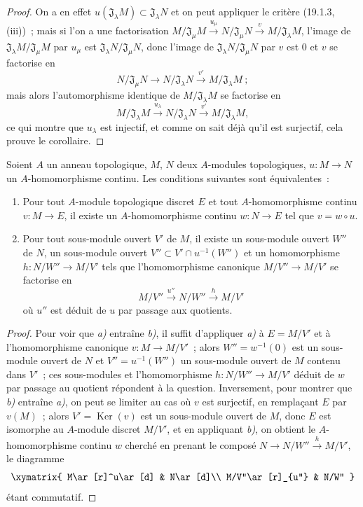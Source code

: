 \begin{proof}
On a en effet $u(\mathfrak J_\lambda M)\subset\mathfrak J_\lambda N$ et on
peut appliquer le critère (19.1.3, (iii))~; mais si l'on a une factorisation
$M/\mathfrak J_\mu M\xrightarrow{u_\mu}N/\mathfrak J_\mu N\xrightarrow{v}M/\mathfrak J_\lambda M$,
l'image de $\mathfrak J_\lambda M/\mathfrak J_\mu M$ par $u_\mu$ est
$\mathfrak J_\lambda N/\mathfrak J_\mu N$, donc l'image de
$\mathfrak J_\lambda N/\mathfrak J_\mu N$ par $v$ est 0 et $v$ se factorise en
\[
  N/\mathfrak J_\mu N\longrightarrow N/\mathfrak J_\lambda N
  \xrightarrow{v'}M/\mathfrak J_\lambda M~;
\]
mais alors l'automorphisme identique de $M/\mathfrak J_\lambda M$ se factorise
en
\[
  M/\mathfrak J_\lambda M\xrightarrow{u_\lambda}
  N/\mathfrak J_\lambda N\xrightarrow{v'}M/\mathfrak J_\lambda M,
\]
ce qui montre que $u_\lambda$ est injectif, et comme on sait déjà qu'il est
surjectif, cela prouve le corollaire.
\end{proof}

\begin{proposition}[19.1.5]
\label{0.19.1.5-fr}
Soient $A$ un anneau topologique, $M$, $N$ deux $A$-modules topologiques,
$u:M\to N$ un $A$-homomorphisme continu. Les conditions suivantes sont
équivalentes~:
\begin{enumerate}
  \item[\textup{a)}] Pour tout $A$-module topologique \textup{discret} $E$ et tout
  $A$-homomorphisme continu $v:M\to E$, il existe un $A$-homomorphisme continu
  $w:N\to E$ tel que $v=w\circ u$.
  \item[\textup{b)}] Pour tout sous-module ouvert $V'$ de $M$, il existe un sous-module
  ouvert $W''$ de $N$, un sous-module ouvert
  $V''\subset V'\cap u^{-1}(W'')$ et un homomorphisme
  $h:N/W''\to M/V'$ tels que l'homomorphisme canonique
  $M/V''\to M/V'$ se factorise en
  \[
    M/V''\xrightarrow{u''}N/W''\xrightarrow{h}M/V'
  \]
  où $u''$ est déduit de $u$ par passage aux quotients.
\end{enumerate}
\end{proposition}

\begin{proof}
Pour voir que \emph{a)} entraîne \emph{b)}, il suffit d'appliquer \emph{a)} à $E=M/V'$ et à
l'homomorphisme canonique $v:M\to M/V'$~; alors $W''=w^{-1}(0)$ est un
sous-module ouvert de $N$ et $V''=u^{-1}(W'')$ un sous-module ouvert de $M$
contenu dans $V'$~; ces sous-modules et l'homomorphisme
$h:N/W''\to M/V'$ déduit de $w$ par passage au quotient répondent à la
question. Inversement, pour montrer que \emph{b)} entraîne \emph{a)}, on peut se limiter au
cas où $v$ est surjectif, en remplaçant $E$ par $v(M)$~; alors
$V'=\operatorname{Ker}(v)$ est un sous-module ouvert de $M$, donc $E$ est
isomorphe au $A$-module discret $M/V'$, et en appliquant \emph{b)}, on obtient
le $A$-homomorphisme continu $w$ cherché en prenant le composé
$N\to N/W''\xrightarrow{h}M/V'$, le diagramme
\[
  \xymatrix{
    M\ar[r]^u\ar[d] & N\ar[d]\\
    M/V''\ar[r]_{u''} & N/W''
  }
\]
étant commutatif.
\end{proof}

